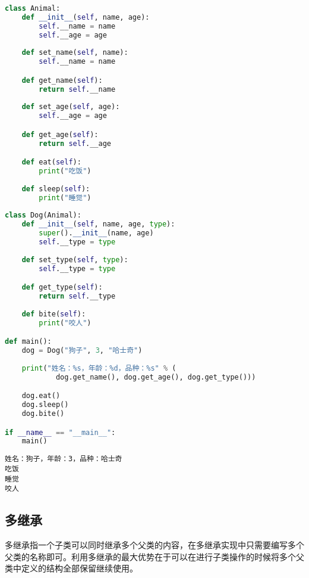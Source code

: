\begin{lstlisting}[language=Python]
class Animal:
    def __init__(self, name, age):
        self.__name = name
        self.__age = age
    
    def set_name(self, name):
        self.__name = name

    def get_name(self):
        return self.__name
    
    def set_age(self, age):
        self.__age = age

    def get_age(self):
        return self.__age

    def eat(self):
        print("吃饭")
    
    def sleep(self):
        print("睡觉")
    
class Dog(Animal):
    def __init__(self, name, age, type):
        super().__init__(name, age)
        self.__type = type
    
    def set_type(self, type):
        self.__type = type

    def get_type(self):
        return self.__type
    
    def bite(self):
        print("咬人")

def main():
    dog = Dog("狗子", 3, "哈士奇")
    
    print("姓名：%s，年龄：%d，品种：%s" % (
            dog.get_name(), dog.get_age(), dog.get_type()))

    dog.eat()
    dog.sleep()
    dog.bite()

if __name__ == "__main__":
    main()
\end{lstlisting}

\begin{tcolorbox}
	\begin{verbatim}
姓名：狗子，年龄：3，品种：哈士奇
吃饭
睡觉
咬人
\end{verbatim}
\end{tcolorbox}

\vspace{0.5cm}

\subsection{多继承}

多继承指一个子类可以同时继承多个父类的内容，在多继承实现中只需要编写多个父类的名称即可。利用多继承的最大优势在于可以在进行子类操作的时候将多个父类中定义的结构全部保留继续使用。\\


